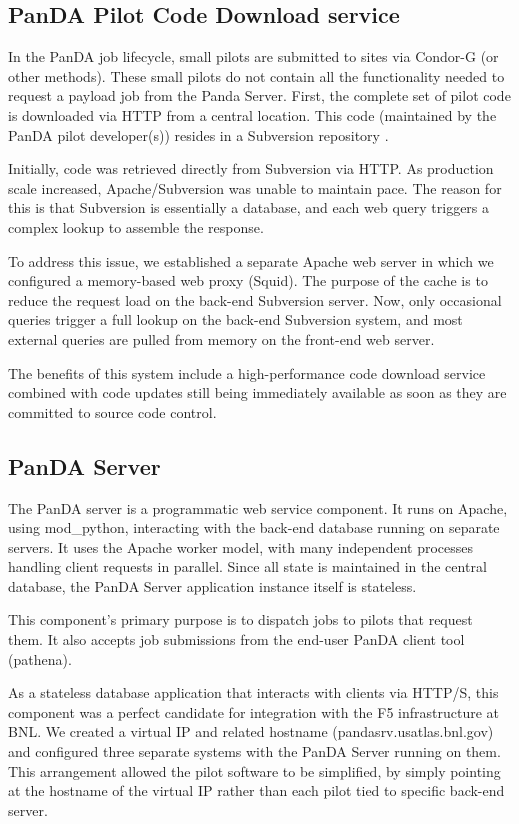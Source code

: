 \documentclass[letterpaper]{jpconf}
\begin{document}
\subsection{PanDA Pilot Code Download service}

In the PanDA job lifecycle, small pilots are submitted to sites via Condor-G
(or other methods). These small pilots do not contain all the functionality
needed to request a payload job from the Panda Server. First, the complete set
of pilot code is downloaded via HTTP from a central location. This code (maintained by 
the PanDA pilot developer(s)) resides in a Subversion repository . 

Initially, code was retrieved directly from Subversion via HTTP. As production
scale increased, Apache/Subversion was unable to maintain pace. The reason for
this is that Subversion is essentially a database, and each web query triggers
a complex lookup to assemble the response. 

To address this issue, we established a separate Apache web server in which we
configured a memory-based web proxy (Squid). The purpose of the cache is to reduce 
the request load on the back-end Subversion server. Now, only occasional
queries trigger a full lookup on the back-end Subversion system, and most
external queries are pulled from memory on the front-end web server. 

The benefits of this system include a high-performance code download service
combined with code updates still being immediately available as soon as they are
committed to source code control.


\subsection{PanDA Server}

The PanDA server is a programmatic web service component. It runs on Apache,
using mod\_python, interacting with the back-end database running on separate
servers. It uses the Apache worker model, with many independent processes
handling client requests in parallel. Since all state is maintained in the
central database, the PanDA Server application instance itself is stateless. 

This component's primary purpose is to dispatch jobs to pilots that
request them. It also accepts job submissions from the end-user PanDA client tool (pathena).

As a stateless database application that interacts with clients via HTTP/S, this
component was a perfect candidate for integration with the F5 infrastructure at BNL. We
created a virtual IP and related hostname (pandasrv.usatlas.bnl.gov) and
configured three separate systems with the PanDA Server running on them. This
arrangement allowed the pilot software to be simplified, by simply pointing at
the hostname of the virtual IP rather than each pilot tied to specific back-end
server. 
\end{document}

